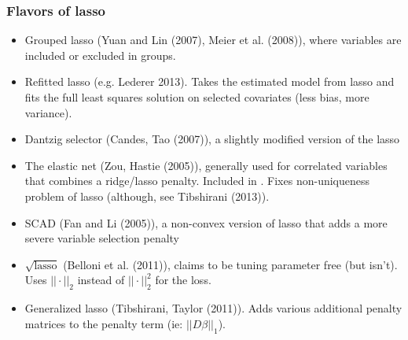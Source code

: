 \documentclass{beamer}
\begin{document}
%
\begin{frame}[fragile]
\frametitle{Flavors of lasso}
\begin{itemize}
\item Grouped lasso (Yuan and Lin (2007), Meier et al. (2008)), where variables are included
or excluded in groups.
\item Refitted lasso (e.g. Lederer 2013).  Takes the estimated model from lasso and fits the full
least squares solution on selected covariates (less bias, more variance).
\item Dantzig selector (Candes, Tao (2007)), a slightly modified version of the lasso
\item The elastic net (Zou, Hastie (2005)), generally used for correlated variables that
combines a ridge/lasso penalty.  Included in .  Fixes non-uniqueness problem
of lasso (although, see Tibshirani (2013)).  
\item SCAD (Fan and Li (2005)), a non-convex version of lasso that adds a more severe variable selection penalty
\item $\sqrt{\textrm{lasso}}$ (Belloni et al. (2011)), claims to be tuning parameter free (but isn't).  Uses $||\cdot||_2$
instead of $||\cdot||_2^2$ for the loss.
\item Generalized lasso (Tibshirani, Taylor (2011)).  Adds various additional penalty matrices to the penalty term (ie: 
$||D\beta||_1$).  
\end{itemize}

\end{frame}
%
%
%
\end{document}
